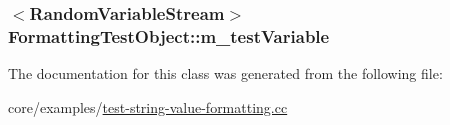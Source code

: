 \subsubsection[{\texorpdfstring{m\+\_\+test\+Variable}{m_testVariable}}]{$<${\bf Random\+Variable\+Stream}$>$ Formatting\+Test\+Object\+::m\+\_\+test\+Variable\hspace{0.3cm}{\ttfamily [private]}}\hypertarget{classFormattingTestObject_a54584305ef7459968edc8a09c1a5fc33}{}\label{classFormattingTestObject_a54584305ef7459968edc8a09c1a5fc33}


The documentation for this class was generated from the following file\+:\begin{DoxyCompactItemize}
\item 
core/examples/\hyperlink{test-string-value-formatting_8cc}{test-\/string-\/value-\/formatting.\+cc}\end{DoxyCompactItemize}
